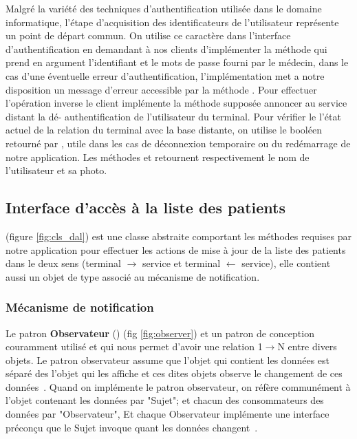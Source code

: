 Malgré la variété des techniques d'authentification utilisée dans le domaine
informatique, l'étape d'acquisition des identificateurs de l'utilisateur
représente un point de départ commun. On utilise ce caractère dans l'interface
d'authentification en demandant à nos clients d'implémenter la méthode
 qui prend en argument l'identifiant et le mots de passe fourni par
le médecin, dans le cas d'une éventuelle erreur d'authentification,
l’implémentation met a notre disposition un message d'erreur accessible par la
méthode . Pour effectuer l’opération inverse le client
implémente la méthode  supposée annoncer au service distant la dé-
authentification de l'utilisateur du terminal. Pour vérifier le l'état actuel de
la relation du terminal avec la base distante, on utilise le booléen retourné
par , utile dans les cas de déconnexion temporaire ou du
redémarrage de notre application. Les méthodes  et
 retournent respectivement le nom de l'utilisateur et sa photo.

\subsection{Interface d’accès à la liste des patients}

 (figure \ref{fig:cls_dal}) est une classe abstraite comportant les
méthodes requises par notre application pour effectuer les actions de mise à
jour de la liste des patients dans le deux sens (terminal $\rightarrow$ service
et terminal $\leftarrow$ service), elle contient aussi un objet de type
 associé au mécanisme de notification.

\subsubsection{Mécanisme de notification}

Le patron \textbf{Observateur} () (fig
\ref{fig:observer}) et un patron de conception couramment utilisé et qui
nous permet d'avoir une relation 1$\rightarrow$N entre divers objets. Le
patron observateur assume que l'objet qui contient les données est
séparé des l’objet qui les affiche et ces dites objets observe le
changement de ces données~\cite{jdp_observer}. Quand on implémente le
patron observateur, on réfère communément à l'objet contenant les
données par "Sujet"; et chacun des consommateurs des données par
"Observateur", Et chaque Observateur implémente une interface préconçu
que le Sujet invoque quant les données changent~\cite{jdp_observer}.

